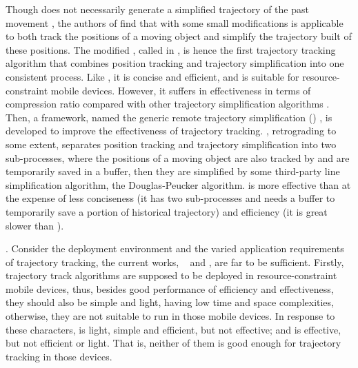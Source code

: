 Though \ldr does not necessarily generate a simplified trajectory of the past movement \cite{Lange:Tracking}, the authors of \cite{Trajcevski:LDRH} find that \ldr with some small modifications is applicable to both track the positions of a moving object and simplify the trajectory built of these positions. The modified \ldr,  called \ldrh in \cite{Lange:Tracking}, is hence the first trajectory tracking algorithm that combines position tracking and trajectory simplification into one consistent process. Like \ldr, it is concise and efficient, and is suitable for resource-constraint mobile devices. However, it suffers in effectiveness in terms of compression ratio compared with other trajectory simplification algorithms \cite{Douglas:Peucker, Lin:Cised}. %
%
Then, a framework, named the generic remote trajectory simplification (\grts) \cite{Lange:GRTS,Lange:Tracking}, is developed to improve the effectiveness of trajectory tracking. \grts, retrograding to some extent, separates position tracking and trajectory simplification into two sub-processes, where the positions of a moving object are also tracked by \ldr and are temporarily saved in a buffer, then they are simplified by some third-party line simplification algorithm, \eg the Douglas-Peucker \cite{Douglas:Peucker} algorithm. \grts is more effective than \ldrh at the expense of less conciseness (it has two sub-processes and needs a buffer to temporarily save a portion of historical trajectory) and efficiency (it is great slower than \ldrh).
%



. Consider the deployment environment and the varied application requirements of trajectory tracking, the current works, \ie~\ldrh \cite{Trajcevski:LDRH} and \grts \cite{Lange:GRTS,Lange:Tracking}, are far to be sufficient. Firstly, trajectory track algorithms are supposed to be deployed in resource-constraint mobile devices, thus, besides good performance of efficiency and effectiveness, they should also be simple and light, \ie having low time and space complexities, otherwise, they are not suitable to run in those mobile devices. In response to these characters, \ldrh is light, simple and efficient, but not effective; and \grts is effective, but not efficient or light. That is, neither of them is good enough for trajectory tracking in those devices.

